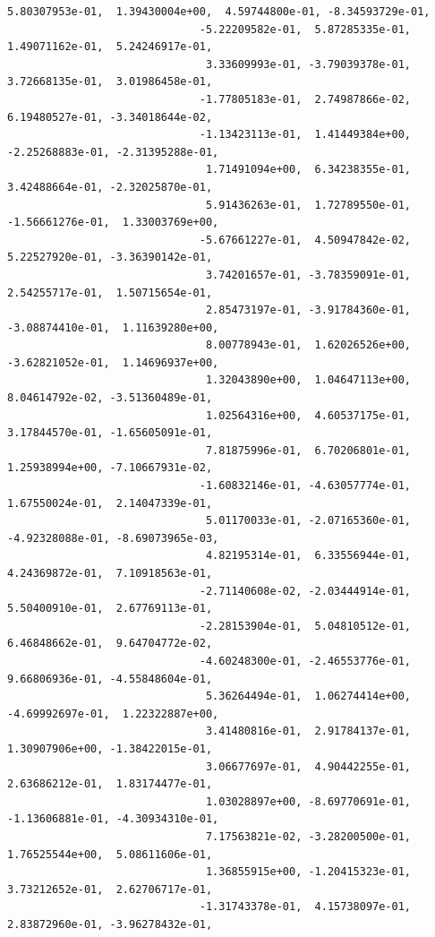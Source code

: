 \documentclass[11pt]{article}
\begin{document}
\begin{Verbatim}[commandchars=\\\{\}]
                               5.80307953e-01,  1.39430004e+00,  4.59744800e-01, -8.34593729e-01,
                              -5.22209582e-01,  5.87285335e-01,  1.49071162e-01,  5.24246917e-01,
                               3.33609993e-01, -3.79039378e-01,  3.72668135e-01,  3.01986458e-01,
                              -1.77805183e-01,  2.74987866e-02,  6.19480527e-01, -3.34018644e-02,
                              -1.13423113e-01,  1.41449384e+00, -2.25268883e-01, -2.31395288e-01,
                               1.71491094e+00,  6.34238355e-01,  3.42488664e-01, -2.32025870e-01,
                               5.91436263e-01,  1.72789550e-01, -1.56661276e-01,  1.33003769e+00,
                              -5.67661227e-01,  4.50947842e-02,  5.22527920e-01, -3.36390142e-01,
                               3.74201657e-01, -3.78359091e-01,  2.54255717e-01,  1.50715654e-01,
                               2.85473197e-01, -3.91784360e-01, -3.08874410e-01,  1.11639280e+00,
                               8.00778943e-01,  1.62026526e+00, -3.62821052e-01,  1.14696937e+00,
                               1.32043890e+00,  1.04647113e+00,  8.04614792e-02, -3.51360489e-01,
                               1.02564316e+00,  4.60537175e-01,  3.17844570e-01, -1.65605091e-01,
                               7.81875996e-01,  6.70206801e-01,  1.25938994e+00, -7.10667931e-02,
                              -1.60832146e-01, -4.63057774e-01,  1.67550024e-01,  2.14047339e-01,
                               5.01170033e-01, -2.07165360e-01, -4.92328088e-01, -8.69073965e-03,
                               4.82195314e-01,  6.33556944e-01,  4.24369872e-01,  7.10918563e-01,
                              -2.71140608e-02, -2.03444914e-01,  5.50400910e-01,  2.67769113e-01,
                              -2.28153904e-01,  5.04810512e-01,  6.46848662e-01,  9.64704772e-02,
                              -4.60248300e-01, -2.46553776e-01,  9.66806936e-01, -4.55848604e-01,
                               5.36264494e-01,  1.06274414e+00, -4.69992697e-01,  1.22322887e+00,
                               3.41480816e-01,  2.91784137e-01,  1.30907906e+00, -1.38422015e-01,
                               3.06677697e-01,  4.90442255e-01,  2.63686212e-01,  1.83174477e-01,
                               1.03028897e+00, -8.69770691e-01, -1.13606881e-01, -4.30934310e-01,
                               7.17563821e-02, -3.28200500e-01,  1.76525544e+00,  5.08611606e-01,
                               1.36855915e+00, -1.20415323e-01,  3.73212652e-01,  2.62706717e-01,
                              -1.31743378e-01,  4.15738097e-01,  2.83872960e-01, -3.96278432e-01,

\end{Verbatim}
\end{document}
